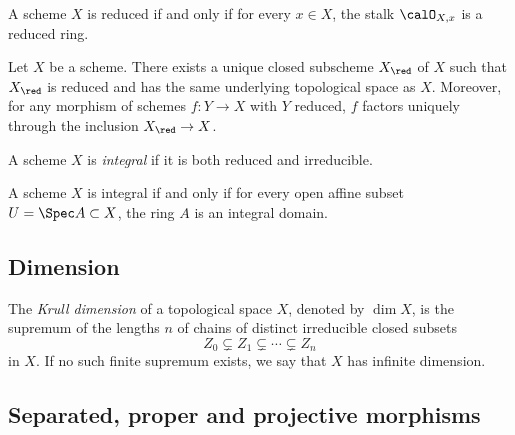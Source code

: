     \begin{proposition}\label{prop:reducedness_is_a_local_property}
        A scheme \(X\) is reduced if and only if for every \(x \in X\), the stalk \(\calO_{X,x}\) is a reduced ring.
    \end{proposition}

    \begin{proposition}\label{prop:universal_property_of_reduced_structure_on_a_scheme}
        Let \(X\) be a scheme.
        There exists a unique closed subscheme \(X_{\red}\) of \(X\) such that \(X_{\red}\) is reduced and has the same underlying topological space as \(X\).
        Moreover, for any morphism of schemes \(f : Y \to X\) with \(Y\) reduced, \(f\) factors uniquely through the inclusion \(X_{\red} \to X\).
    \end{proposition}

    \begin{definition}\label{def:integral_scheme}
        A scheme \(X\) is \emph{integral} if it is both reduced and irreducible.
    \end{definition}

    \begin{proposition}\label{prop:integral_scheme_characterization}
        A scheme \(X\) is integral if and only if for every open affine subset \(U = \Spec A \subset X\), the ring \(A\) is an integral domain.
    \end{proposition}

\subsection{Dimension}

    \begin{definition}\label{def:krull_dimension_of_topological_space}
        The \emph{Krull dimension} of a topological space \(X\), denoted by \(\dim X\), is the supremum of the lengths \(n\) of chains of distinct irreducible closed subsets
        \[ Z_0 \subsetneq Z_1 \subsetneq \cdots \subsetneq Z_n \]
        in \(X\).
        If no such finite supremum exists, we say that \(X\) has infinite dimension.
    \end{definition}

\subsection{Separated, proper and projective morphisms}

